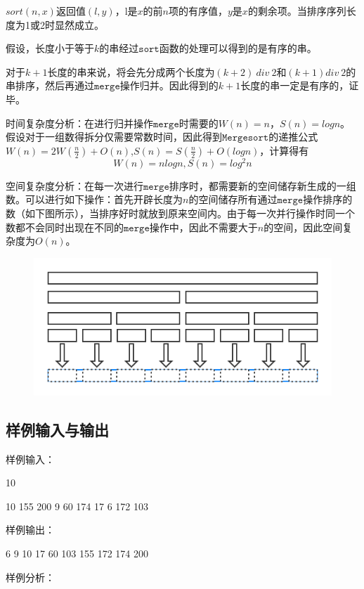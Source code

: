 \documentclass[UTF8,a4paperdui, %
]{ctexart}
\begin{document}
$sort(n, x)$返回值$(l, y)$，l是$x$的前$n$项的有序值，$y$是$x$的剩余项。当排序序列长度为1或2时显然成立。

假设，长度小于等于$k$的串经过$\texttt{sort}$函数的处理可以得到的是有序的串。

对于$k+1$长度的串来说，将会先分成两个长度为$(k+2)\ div\ 2$和$(k+1) div\ 2$的串排序，然后再通过$\texttt{merge}$操作归并。因此得到的$k+1$长度的串一定是有序的，证毕。

时间复杂度分析：在进行归并操作$\texttt{merge}$时需要的$W(n)=n$，$S(n)=logn$。假设对于一组数得拆分仅需要常数时间，因此得到$\texttt{Mergesort}$的递推公式$W(n)=2W(\frac{n}{2})+O(n)$,$S(n)=S(\frac{n}{2})+O(logn)$，计算得有
\[
W(n)=nlogn, S(n)=log^2n
\]

空间复杂度分析：在每一次进行$\texttt{merge}$排序时，都需要新的空间储存新生成的一组数。可以进行如下操作：首先开辟长度为$n$的空间储存所有通过$\texttt{merge}$操作排序的数（如下图所示），当排序好时就放到原来空间内。由于每一次并行操作时同一个数都不会同时出现在不同的$\texttt{merge}$操作中，因此不需要大于$n$的空间，因此空间复杂度为$O(n)$。

\begin{figure}[ht]
\centering
\includegraphics[scale=0.66]{空间.png}
\end{figure}

\subsection{样例输入与输出}
样例输入：

10

10 155 200 9 60 174 17 6 172 103

样例输出：

6 9 10 17 60 103 155 172 174 200 

样例分析：
\end{document}
